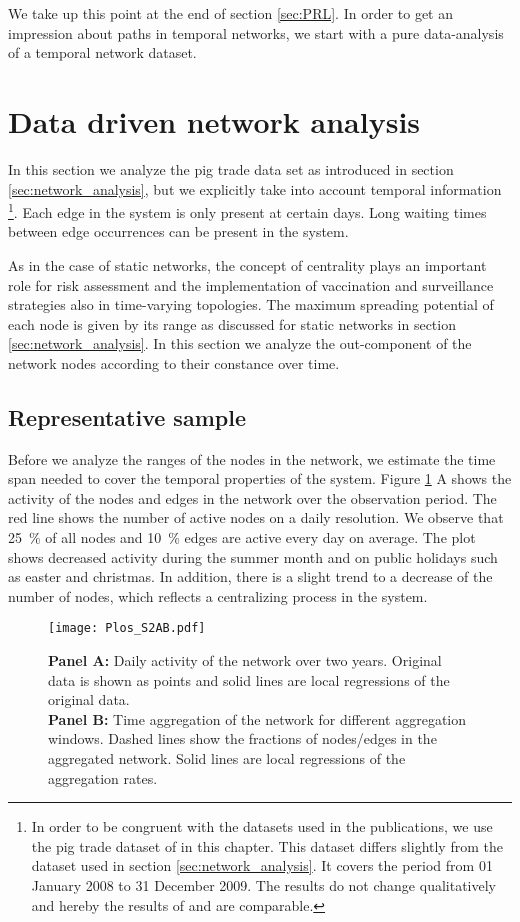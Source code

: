 We take up this point at the end of section \ref{sec:PRL}.
In order to get an impression about paths in temporal networks, we start with a pure data-analysis of a temporal network dataset. 



\section{Data driven network analysis}\label{sec:Plos}
In this section we analyze the pig trade data set as introduced in section \ref{sec:network_analysis}, but we explicitly take into account temporal information%
\footnote{%
In order to be congruent with the datasets used in the publications, we use the pig trade dataset of \citep{Konschake:2013js} in this chapter.
This dataset differs slightly from the dataset used in section \ref{sec:network_analysis}.
It covers the period from 01 January 2008 to 31 December 2009.
The results do not change qualitatively and hereby the results of \citep{Konschake:2013js} and \citep{Lentz:2013PRL} are comparable.}. %
Each edge in the system is only present at certain days.
Long waiting times between edge occurrences can be present in the system.

As in the case of static networks, the concept of centrality plays an important role for risk assessment and the implementation of vaccination and surveillance strategies also in time-varying topologies.
The maximum spreading potential of each node is given by its range as discussed for static networks in section \ref{sec:network_analysis}.
In this section we analyze the out-component of the network nodes according to their constance over time.

\subsection{Representative sample}
Before we analyze the ranges of the nodes in the network, we estimate the time span needed to cover the temporal properties of the system.
Figure \ref{fig:Plos_S1} A shows the activity of the nodes and edges in the network over the observation period.
The red line shows the number of active nodes on a daily resolution.
We observe that 25~\% of all nodes and 10~\% edges are active every day on average.
The plot shows decreased activity during the summer month and on public holidays such as easter and christmas.
In addition, there is a slight trend to a decrease of the number of nodes, which reflects a centralizing process in the system.
%
\begin{figure}[htbp]
\begin{center}
\texttt{[image: Plos\_S2AB.pdf]}
\caption{\textbf{Panel A:} Daily activity of the network over two years.
Original data is shown as points and solid lines are local regressions of the original data.\\
\textbf{Panel B:} Time aggregation of the network for different aggregation windows.
Dashed lines show the fractions of nodes/edges in the aggregated network.
Solid lines are local regressions of the aggregation rates.
}
\label{fig:Plos_S1}
\end{center}
\end{figure}

